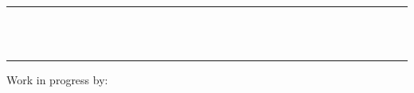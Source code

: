 \documentclass[12pt,fleqn,landscape]{article}
\begin{document}
\sffamily\bfseries\boldmath



\newcommand{\arity}[2]{\stackrel{\tt#1}{#2}}


\newcommand{\lexp}{$\lambda$-expression}
\newcommand{\lc}{$\lambda$-calculus}
\newcommand{\lopen}{\Lambda^o}
\newcommand{\lclosed}{\Lambda^\bullet}
\newcommand{\lnf}{\Lambda^{nf}}



\newcommand{\mv}[2]{R_{#2}:=R_{#1}}

\newcommand{\out}{\mbox{\bf out}}
\newcommand{\ifc}{\mbox{\bf if}}
\newcommand{\thenc}{\mbox{\bf then}}
\newcommand{\elsec}{\mbox{\bf else}}
\newcommand{\nil}{\mbox{\bf skip}}
\newcommand{\false}{\mbox{\sl false}}
\newcommand{\true}{\mbox{\sl true}}
\newcommand{\while}{\mbox{\bf while}}
\newcommand{\decl}{\mbox{\sl declassify}}
\newcommand{\dow}{\mbox{\bf do}}
\newcommand{\ew}{\mbox{\bf endw}}
\newcommand{\eif}{\mbox{\bf fi}}
\newcommand{\casec}{\mbox{\bf case}}
\newcommand{\ofc}{\mbox{\bf of}}
\newcommand{\letc}{\mbox{\bf let}}
\newcommand{\inc}{\mbox{\bf in}}


\newcommand{\dobf}[1]{dob(#1)}

\newcommand{\pp}[1]{ ^{#1.}}
\newcommand{\outp}{\mbox{\bf output}}
\newcommand{\inpp}{\mbox{\bf input}}

\newcommand{\skipc}{\nil}


\color{Black}\LARGE







\thispagestyle{empty}
{\ }\vspace{2ex}
\begin{center} \Huge 
   \rule{18cm}{5pt} \\[1ex]
    \\
   
   \rule{18cm}{5pt}
\end{center}


\begin{center}\LARGE

Work in progress by:
\vair

\bi
\item 
 \\\hair
{}\\
\vair\vair

\item 
 \\\hair
{}\\
\ei
\end{center}
\end{document}
